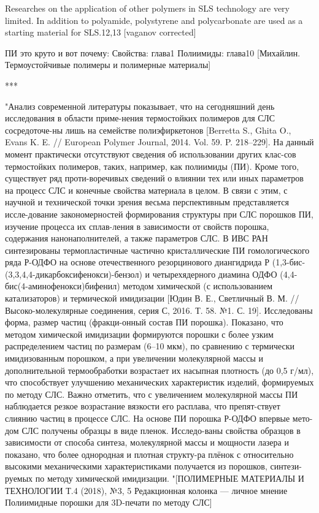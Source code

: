 	Researches on the application of other polymers in SLS technology are very limited. In addition to polyamide, polystyrene and polycarbonate are used as a starting material for SLS.12,13
	[vaganov corrected]
	

	
	ПИ это круто и вот почему:
	Свойства: глава1
	Полиимиды: глава10
	[Михайлин. Термоустойчивые полимеры и полимерные материалы]
	
	
	
	***
	
	
	"Анализ современной литературы показывает, что на сегодняшний день исследования в области приме-нения термостойких полимеров для СЛС сосредоточе-ны лишь на семействе полиэфиркетонов [Berretta S., Ghita O., Evans K. E. // European Polymer Journal, 2014. Vol. 59. P. 218–229]. На данный момент практически отсутствуют сведения об использовании других клас-сов термостойких полимеров, таких, например, как полиимиды (ПИ). Кроме того, существует ряд проти-воречивых сведений о влиянии тех или иных параметров на процесс СЛС и конечные свойства материала в целом. В связи с этим, с научной и технической точки зрения весьма перспективным представляется иссле-дование закономерностей формирования структуры при СЛС порошков ПИ, изучение процесса их сплав-ления в зависимости от свойств порошка, содержания нанонаполнителей, а также параметров СЛС.
	В ИВС РАН синтезированы термопластичные частично кристаллические ПИ гомологического ряда Р-ОДФО на основе отечественного резорцинового диангидрида Р (1,3-бис-(3,3,4,4-дикарбоксифенокси)-бензол) и четырехядерного диамина ОДФО (4,4-бис(4-аминофенокси)бифенил) методом химической (с использованием катализаторов) и термической имидизации [Юдин В. Е., Светличный В. М. // Высоко-молекулярные соединения, серия С, 2016. Т. 58. №1. С. 19]. Исследованы форма, размер частиц (фракци-онный состав ПИ порошка). Показано, что методом химической имидизации формируются порошки с более узким распределением частиц по размерам (6–10 мкм), по сравнению с термически имидизованным порошком, а при увеличении молекулярной массы и дополнительной термообработки возрастает их насыпная плотность (до 0,5 г/мл), что способствует улучшению механических характеристик изделий, формируемых по методу СЛС. Важно отметить, что с увеличением молекулярной массы ПИ наблюдается резкое возрастание вязкости его расплава, что препят-ствует слиянию частиц в процессе СЛС.
На основе ПИ порошка Р-ОДФО впервые мето-дом СЛС получены образцы в виде пленок. Исследо-ваны свойства образцов в зависимости от способа синтеза, молекулярной массы и мощности лазера и показано, что более однородная и плотная структу-ра плёнок с относительно высокими механическими характеристиками получается из порошков, синтези-руемых по методу химической имидизации.
	"[ПОЛИМЕРНЫЕ МАТЕРИАЛЫ И ТЕХНОЛОГИИ Т.4 (2018), №3, 5
Редакционная колонка — личное мнение
Полиимидные порошки для 3D-печати по методу СЛС]
	
